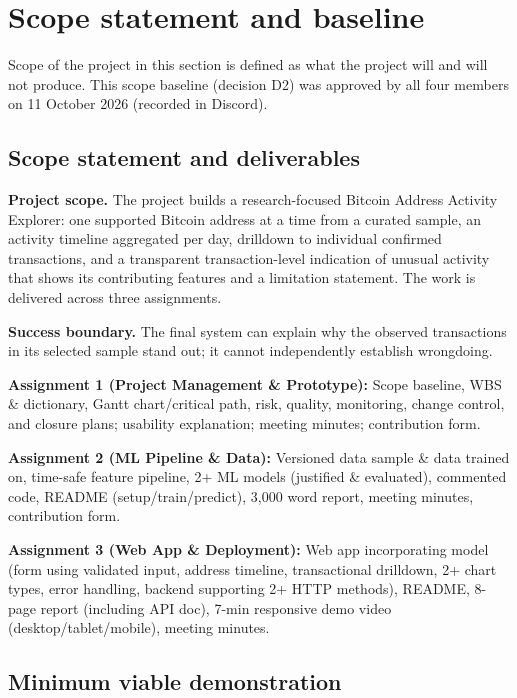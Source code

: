 \section{Scope statement and baseline}
\label{sec:scope}

Scope of the project in this section is defined as what the project will and will not produce. This scope baseline (decision D2) was approved by all four members on 11 October 2026 (recorded in Discord).

\subsection{Scope statement and deliverables}
\label{sec:deliverables}

\textbf{Project scope.} The project builds a research-focused Bitcoin Address Activity Explorer: one supported Bitcoin address at a time from a curated sample, an activity timeline aggregated per day, drilldown to individual confirmed transactions, and a transparent transaction-level indication of unusual activity that shows its contributing features and a limitation statement. The work is delivered across three assignments.

\textbf{Success boundary.} The final system can explain why the observed transactions in its selected sample stand out; it cannot independently establish wrongdoing.

\textbf{Assignment 1 (Project Management \& Prototype):} Scope baseline, WBS \& dictionary, Gantt chart/critical path, risk, quality, monitoring, change control, and closure plans; usability explanation; meeting minutes; contribution form.

\textbf{Assignment 2 (ML Pipeline \& Data):} Versioned data sample \& data trained on, time-safe feature pipeline, 2+ ML models (justified \& evaluated), commented code, README (setup/train/predict), 3,000 word report, meeting minutes, contribution form.

\textbf{Assignment 3 (Web App \& Deployment):} Web app incorporating model (form using validated input, address timeline, transactional drilldown, 2+ chart types, error handling, backend supporting 2+ HTTP methods), README, 8-page report (including API doc), 7-min responsive demo video (desktop/tablet/mobile), meeting minutes.

\subsection{Minimum viable demonstration}
\label{sec:mvd}

